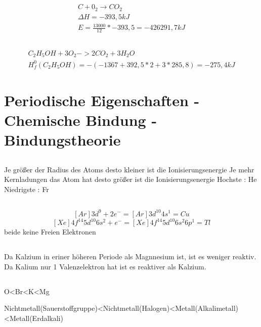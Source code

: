 \documentclass[a4paper]{article}
\begin{document}
\subsection{}
\begin{align}
  C + 0_2 \rightarrow CO_2\\
  \Delta H = -393,5kJ\\
  E = \frac{13000}{12}*-393,5=-426291,7kJ
\end{align}

\subsection{}
\begin{align}
  C_2H_5OH + 3 O_2 -> 2 CO_2 + 3 H_2O\\
  H^0_f(C_2H_5OH)=-(-1367+392,5*2+3*285,8)=-275,4kJ
\end{align}

\section{Periodische Eigenschaften - Chemische Bindung - Bindungstheorie}
\subsection{}
Je größer der Radius des Atoms desto kleiner ist die Ionisierungsenergie
Je mehr Kernladungen das Atom hat desto größer ist die Ionisierungsenergie
Hochste : He
Niedrigste : Fr

\subsection{}
\[[Ar]3d^9 +2e^- = [Ar]3d^{10}4s^1 = Cu\]
\[[Xe]4f^{14}5d^{10}6s^{2} + e^- = [Xe]4f^{14}5d^{10}6s^{2}6p^1 = Tl\]
beide keine Freien Elektronen 

\subsection{}
  Da Kalzium in eriner höheren Periode als Magnnesium ist, ist es weniger reaktiv.
  Da Kalium nur 1 Valenzelektron hat ist es reaktiver als Kalzium.

\subsection{}
  O<Br<K<Mg

  Nichtmetall(Sauerstoffgruppe)<Nichtmetall(Halogen)<Metall(Alkalimetall)<Metall(Erdalkali)
\end{document}
